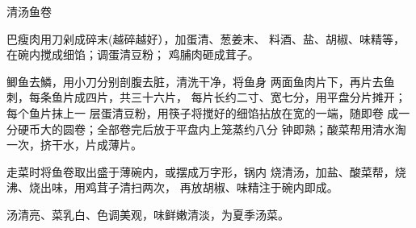 \begin{recipe}{清汤鱼卷}

\ingredients


\cooking

巴瘦肉用刀剁成碎末(越碎越好），加蛋清、葱姜末、 料酒、盐、胡椒、味精等，在碗内搅成细馅；调蛋清豆粉； 鸡脯肉砸成茸子。

\step 	鲫鱼去鱗，用小刀分别剖腹去脏，清洗干净，将鱼身 两面鱼肉片下，再片去鱼刺，每条鱼片成四片，共三十六片， 每片长约二寸、宽七分，用平盘分片摊开；每个鱼片抹上一 层蛋清豆粉，用筷子将搅好的细馅拈放在宽的一端，随即卷 成一分硬币大的圆卷；全部卷完后放于平盘内上笼蒸约八分 钟即熟；酸菜帮用清水淘一次，挤干水，片成薄片。

\step 	走菜时将鱼卷取出盛于薄碗内，或摆成万字形，锅内 烧清汤，加盐、酸菜帮，烧沸、烧出味，用鸡茸子清扫两次， 再放胡椒、味精注于碗内即成。

\notes

汤清亮、菜乳白、色调美观，味鲜嫩清淡，为夏季汤菜。

\end{recipe}


